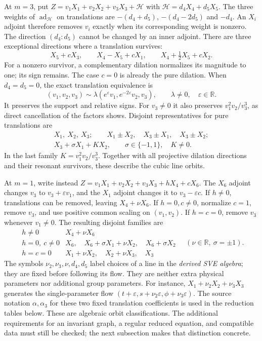 At $m=3$, put $Z=v_1X_1+v_2X_2+v_3X_3+\mathcal H$ with
$\mathcal H=d_4X_4+d_5X_5$. The three weights of
$\operatorname{ad}_{\mathcal H}$ on translations are
$-(d_4+d_5)$, $-(d_4-2d_5)$ and $-d_4$. An $X_i$ adjoint therefore removes
$v_i$ exactly when its corresponding weight is nonzero. The direction
$(d_4:d_5)$ cannot be changed by an inner adjoint. There are three exceptional
directions where a translation survives:
\[
 X_5+cX_3,\qquad X_4-X_5+cX_1,\qquad
 X_4+\tfrac12X_5+cX_2.
\]
For a nonzero survivor, a complementary dilation normalizes its magnitude
to one; its sign remains. The case $c=0$ is already the pure dilation.
When $d_4=d_5=0$, the exact translation equivalence is
\begin{equation}
 (v_1,v_2,v_3)\sim\lambda(e^\varepsilon v_1,e^{-2\varepsilon}v_2,v_3),
 \qquad \lambda\ne0,\quad\varepsilon\in\mathbb R.
 \label{eq:sve-translation-orbits}
\end{equation}
It preserves the support and relative signs. For $v_3\ne0$ it also
preserves $v_1^2v_2/v_3^3$, as direct cancellation of the factors shows.
Disjoint representatives for pure translations are
\[
 \begin{gathered}
 X_1,\ X_2,\ X_3;\qquad X_1\pm X_2,\quad X_3\pm X_1,\quad X_3\pm X_2;\\
 X_3+\sigma X_1+KX_2,\qquad \sigma\in\{-1,1\},\quad K\ne0.
 \end{gathered}
\]
In the last family $K=v_1^2v_2/v_3^3$. Together with all projective
dilation directions and their resonant survivors, these describe the
cubic line orbits.

At $m=1$, write instead $Z=v_1X_1+v_2X_2+v_3X_3+hX_4+cX_6$.
The $X_6$ adjoint changes $v_3$ to $v_3+\varepsilon v_1$, and the
$X_1$ adjoint changes it to $v_3-\varepsilon c$. If $h\ne0$,
translations can be removed, leaving $X_4+\nu X_6$. If $h=0,c\ne0$,
normalize $c=1$, remove $v_3$, and use positive common scaling on
$(v_1,v_2)$. If $h=c=0$, remove $v_3$ whenever $v_1\ne0$.
The resulting disjoint families are
\[
 \begin{array}{c|l}
 h\ne0 & X_4+\nu X_6\\
 h=0,\ c\ne0 & X_6,\quad X_6+\sigma X_1+\nu X_2,\quad X_6+\sigma X_2\\
 h=c=0 & X_1+\nu X_2,\quad X_2+\nu X_3,\quad X_3
 \end{array}
 \quad(\nu\in\mathbb R,\ \sigma=\pm1).
\]
The symbols $\nu_2,\nu_3,\nu,d_4,d_5$ label choices of a line in the
\emph{derived SVE algebra}; they are fixed before following its flow.
They are neither extra physical parameters nor additional group parameters.
For instance, $X_1+\nu_2X_2+\nu_3X_3$ generates the single-parameter
flow $(t+\varepsilon,s+\nu_2\varepsilon,\phi+\nu_3\varepsilon)$.
The source notation $\alpha,\alpha_3$ for these two fixed translation
coefficients is used in the reduction tables below.
These are algebraic orbit classifications. The additional requirements
for an invariant graph, a regular reduced equation, and compatible data
must still be checked; the next subsection makes that distinction concrete.

